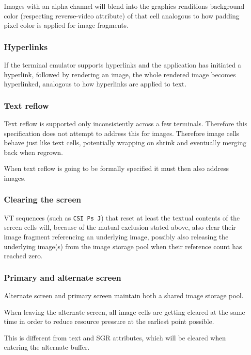 \documentclass[a4paper]{article}
\newcommand{\code}[1]{\colorbox{light-gray}{\texttt{#1}}}
\begin{document}
Images with an alpha channel will blend into the graphics renditions
background color (respecting reverse-video attribute) of that cell analogous
to how padding pixel color is applied for image fragments.

\subsubsection*{Hyperlinks}

If the terminal emulator supports hyperlinks and the application has initiated
a hyperlink, followed by rendering an image, the whole rendered image becomes
hyperlinked, analogous to how hyperlinks are applied to text.

\subsubsection*{Text reflow}

Text reflow is supported only inconsistently across a few terminals. Therefore this
specification does not attempt to address this for images.
Therefore image cells behave just like text cells,
potentially wrapping on shrink and eventually merging back when regrown.

When text reflow is going to be formally specified it must then also address images.

\subsubsection*{Clearing the screen}

VT sequences (such as \code{CSI Ps J}) that reset at least the textual contents
of the screen cells will, because of the mutual exclusion stated above, also
clear their image fragment referencing an underlying image,
possibly also releasing the underlying image(s) from the image storage pool
when their reference count has reached zero.

\subsubsection*{Primary and alternate screen}

Alternate screen and primary screen maintain both a shared image storage pool.

When leaving the alternate screen, all image cells are getting cleared at the
same time in order to reduce resource pressure at the earliest point possible.

This is different from text and SGR attributes, which will be cleared when
entering the alternate buffer.
\end{document}
